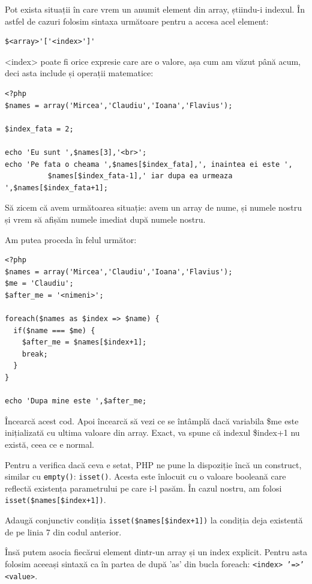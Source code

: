 Pot exista situații în care vrem un anumit element din array, știindu-i
indexul. În astfel de cazuri folosim sintaxa următoare pentru a accesa
acel element:
\begin{verbatim}
$<array>'['<index>']'
\end{verbatim}
<index> poate fi orice expresie care are o valore, așa cum am văzut până acum,
deci asta include și operații matematice:
\begin{lstlisting}
<?php
$names = array('Mircea','Claudiu','Ioana','Flavius');

$index_fata = 2;

echo 'Eu sunt ',$names[3],'<br>';
echo 'Pe fata o cheama ',$names[$index_fata],', inaintea ei este ',
		  $names[$index_fata-1],' iar dupa ea urmeaza ',$names[$index_fata+1];
\end{lstlisting}

Să zicem că avem următoarea situație: avem un array de nume,
și numele nostru și vrem să afișăm numele imediat după numele nostru.

Am putea proceda în felul următor:
\begin{lstlisting}[caption={Indexurile sunt consecutive},label=lst:increment]
<?php
$names = array('Mircea','Claudiu','Ioana','Flavius');
$me = 'Claudiu';
$after_me = '<nimeni>';

foreach($names as $index => $name) {
  if($name === $me) {
	$after_me = $names[$index+1];
	break;
  }
}

echo 'Dupa mine este ',$after_me;
\end{lstlisting}
Încearcă acest cod. Apoi încearcă să vezi ce se întâmplă dacă variabila
\$me este inițializată cu ultima valoare din array. Exact, va
spune că indexul \$index+1 nu există, ceea ce e normal.

Pentru a verifica dacă ceva e setat, PHP ne pune la dispoziție
încă un construct, similar cu \texttt{empty()}: \texttt{isset()}.
Acesta este înlocuit cu o valoare booleană care reflectă
existența parametrului pe care i-l pasăm. În cazul nostru,
am folosi \texttt{isset(\$names[\$index+1])}.

\begin{Exercise}[title={O conjuncție în practică}]
Adaugă conjunctiv condiția \texttt{isset(\$names[\$index+1])} la condiția
deja existentă de pe linia 7 din codul anterior.
\end{Exercise}

Însă putem asocia fiecărui element dintr-un array și
un index explicit. Pentru asta folosim aceeași sintaxă ca
în partea de după 'as' din bucla foreach: \texttt{<index> '=>' <value>}.


